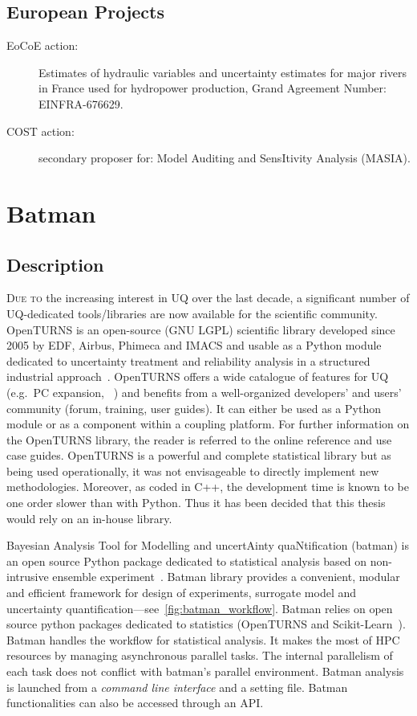 \section*{European Projects}

\begin{description}
\item[EoCoE action:] Estimates of hydraulic variables and uncertainty estimates for major rivers in France used for hydropower production, Grand Agreement Number: EINFRA-676629.
\item[COST action:] secondary proposer for: Model Auditing and SensItivity Analysis (MASIA).
\end{description}


\chapter{Batman}\label{chap:batman}

\section{Description}

\lettrine{D}{ue to} the increasing interest in UQ over the last decade, a significant number of UQ-dedicated tools/libraries are now available for the scientific community. OpenTURNS is an open-source (GNU LGPL) scientific library developed since 2005 by EDF, Airbus, Phimeca and IMACS and usable as a Python module dedicated to uncertainty treatment and reliability analysis in a structured industrial approach~\citep{baudin2015}. OpenTURNS offers a wide catalogue of features for UQ (e.g.~PC expansion, \citeauthor{dutka2009}~\citeyear{dutka2009}) and benefits from a well-organized developers' and users' community (forum, training, user guides). It can either be used as a Python module or as a component within a coupling platform. For further information on the OpenTURNS library, the reader is referred to the online reference and use case guides. OpenTURNS is a powerful and complete statistical library but as being used operationally, it was not envisageable to directly implement new methodologies. Moreover, as coded in C++, the development time is known to be one order slower than with Python. Thus it has been decided that this thesis would rely on an in-house library.

Bayesian Analysis Tool for Modelling and uncertAinty quaNtification (batman) is an open source Python package dedicated to statistical analysis based on non-intrusive ensemble experiment~\cite{roy2018}. Batman library provides a convenient, modular and efficient framework for design of experiments, surrogate model and uncertainty quantification---see~\cref{fig:batman_workflow}. Batman relies on open source python packages dedicated to statistics (OpenTURNS and Scikit-Learn~\citep{pedregosa2011}). Batman handles the workflow for statistical analysis. It makes the most of HPC resources by managing asynchronous parallel tasks. The internal parallelism of each task does not conflict with batman's parallel environment. Batman analysis is launched from a \emph{command line interface} and a setting file. Batman functionalities can also be accessed through an API.

